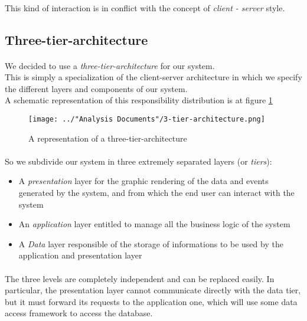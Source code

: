 \paragraph{} This kind of interaction is in conflict with the concept of \textit{client - server} style.
\subsection{Three-tier-architecture}
\paragraph{} We decided to use a \textit{three-tier-architecture} for our system.\\
This is simply a specialization of the client-server architecture in which we specify the different layers and components of our system.\\
A schematic representation of this responsibility distribution is at figure \ref{fig:3-tier-architecture}

\begin{figure}[H]
	\centering
	\texttt{[image: ../"Analysis Documents"/3-tier-architecture.png]}
	\caption{A representation of a three-tier-architecture}
	\label{fig:3-tier-architecture}
\end{figure}
\paragraph{} So we subdivide our system in three extremely separated layers (or \textit{tiers}):
\begin{itemize}
	\item A \textit{presentation} layer for the graphic rendering of the data and events generated by the system, and from which the end user can interact with the system
	\item An \textit{application} layer entitled to manage all the business logic of the system
	\item A \textit{Data} layer responsible of the storage of informations to be used by the application and presentation layer
\end{itemize}
\paragraph{}The three levels are completely independent and can be replaced easily. In particular, the presentation layer cannot communicate directly with the data tier, but it must forward its requests to the application one, which will use some data access framework to access the database.
